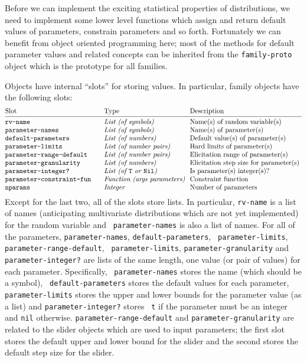 Before we can implement the exciting statistical properties of
distributions, we need to implement some lower level functions which
assign and return default values of parameters, constrain parameters
and so forth.  Fortunately we can benefit from object oriented
programming here; most of the methods for default parameter values and
related concepts can be inherited from the {\tt family-proto\/} object
which is the prototype for all families.  

Objects have internal ``slots'' for storing values.  In particular,
family objects have the following slots:
$$\vbox{
\halign{\tt # \hfil\ & \ \it #\hfil \ &\rm #\hfil\cr
{\rm Slot} & {\rm Type} & Description\cr
\noalign{\smallskip\hrule\smallskip}
rv-name & List (of symbols) & Name(s) of random variable(s)\cr
parameter-names & List (of symbols) & Name(s) of parameter(s)\cr
default-parameters & List (of numbers) & Default value(s) of parameter(s)\cr
parameter-limits & List (of number pairs) & Hard limits of parameter(s)\cr
parameter-range-default & List (of number pairs) & Elicitation range of parameter(s)\cr
parameter-granularity & List (of numbers) & Elicitation step size for parameter(s) \cr
parameter-integer? & List (of {\tt T} or {\tt Nil\/}) & Is parameter(s) integer(s)?\cr 
parameter-constraint-fun & Function (args parameters) & Constraint function\cr
nparams & Integer & Number of parameters \cr
}}$$
Except for the last two, all of the slots store lists.  In particular,
{\tt rv-name\/} is a list of names (anticipating multivariate distributions
which are not yet implemented) for the random variable and {\tt
parameter-names\/} is also a list of names.  For all of the
parameters, {\tt parameter-names\/}, {\tt default-parameters\/}, {\tt
parameter-limits\/}, {\tt parameter-range-default\/}, {\tt
parameter-limits\/}, {\tt parameter-granularity\/} and {\tt
parameter-integer?\/} are lists of the same length,  one value (or
pair of values) for each parameter.  Specifically, {\tt
parameter-names\/} stores the name (which should be a symbol), {\tt
default-parameters\/} stores the default values for each parameter,
{\tt parameter-limits\/} stores the upper and lower bounds for the
parameter value (as a list) and {\tt parameter-integer?\/} stores {\tt
t\/} if the parameter must be an integer and {\tt nil} otherwise.
{\tt parameter-range-default\/} and {\tt parameter-granularity\/} are
related to the slider objects which are used to input parameters; the
first slot stores the default upper and lower bound for the slider and
the second stores the default step size for the slider.  

